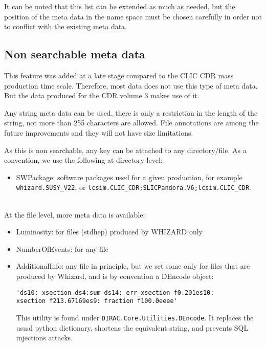 \documentclass[11pt,a4paper]{scrartcl}
\begin{document}
It can be noted that this list can be extended as much as needed, but the
position of the meta data in the name space must be chosen carefully in order
not to conflict with the existing meta data.

\subsection{Non searchable meta data}
This feature was added at a late stage compared to the CLIC CDR mass production
time scale. Therefore, most data does not use this type of meta data. But the
data produced for the CDR volume 3 makes use of it. 

Any string meta data can be used, there is only a restriction in the length of
the string, not more than 255 characters are allowed. File annotations are among
the future improvements and they will not have size limitations.

As this is non searchable, any key can be attached to any directory/file. As a
convention, we use the following at directory level:
\begin{itemize}
  \item SWPackage: software packages used for a given production, for example\\
  \lstinline|whizard.SUSY_V22|, or
  \lstinline|lcsim.CLIC_CDR;SLICPandora.V6;lcsim.CLIC_CDR|.
\end{itemize}

~\\

At the file level, more meta data is available:
\begin{itemize}
  \item Luminosity: for files (stdhep) produced by WHIZARD only
  \item NumberOfEvents: for any file
  \item AdditionalInfo: any file in principle, but we set some only
  for files that are produced by Whizard, and is by convention a
  DEncode object: \\ 
  \begin{lstlisting}
'ds10: xsection ds4:sum ds14: err_xsection f0.201es10:
xsection f213.67169es9: fraction f100.0eeee'
  \end{lstlisting}
  This utility is found under \lstinline|DIRAC.Core.Utilities.DEncode|. It
  replaces the usual python dictionary, shortens the equivalent string, and
  prevents SQL injections attacks.
\end{itemize}

~\\
\end{document}

